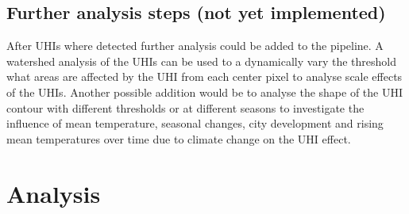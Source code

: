 \documentclass[a4paper, english]{article}
\begin{document}
\subsection{Further analysis steps (not yet implemented)}
After \acp{UHI} where detected further analysis could be added to the pipeline. 
A watershed analysis of the \acp{UHI} can be used to a dynamically vary the threshold what areas are affected by the \ac{UHI} from each center pixel to analyse scale effects of the \acp{UHI}. 
Another possible  addition would be to analyse the shape of the \ac{UHI} contour with different thresholds or at different seasons to investigate the influence of mean temperature, seasonal changes, city development and rising mean temperatures over time due to climate change on the \ac{UHI} effect. 
\newpage
\section{Analysis}\label{sec:analysis}
\end{document}
